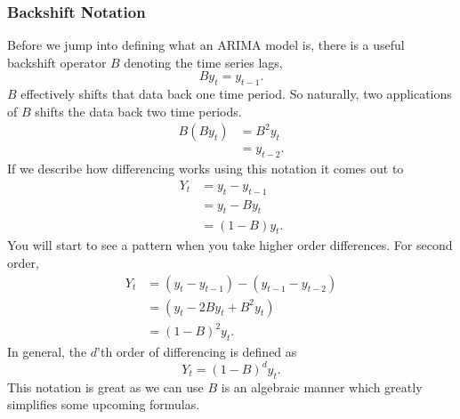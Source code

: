 \documentclass{article}
\begin{document}
  \subsubsection{Backshift Notation}
  Before we jump into defining what an ARIMA model is, there is a useful backshift operator $B$ denoting the time series lags,
  \begin{equation*}
    By_t = y_{t-1}.
  \end{equation*}
  $B$ effectively shifts that data back one time period. So naturally, two applications of $B$ shifts the data back two time periods. 
  \begin{align*}
    B(By_t) &= B^2y_t \\
    &= y_{t-2}.
  \end{align*}
  If we describe how differencing works using this notation it comes out to
  \begin{align*}
    Y_t &= y_t - y_{t-1} \\
    &= y_t - By_t \\
    &= (1 - B)y_t.
  \end{align*}
  You will start to see a pattern when you take higher order differences. For second order,
  \begin{align*}
    Y_t &= (y_t - y_{t-1}) - (y_{t-1} - y_{t-2}) \\
    &= (y_t - 2By_t + B^2y_t) \\
    &= (1 - B)^2y_t.
  \end{align*}
  In general, the $d$'th order of differencing is defined as 
  \begin{equation*}
    Y_t = (1 - B)^dy_t.
  \end{equation*}
  This notation is great as we can use $B$ is an algebraic manner which greatly simplifies some upcoming formulas.
\end{document}

